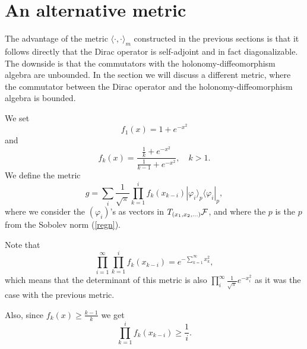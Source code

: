 \documentclass[letterpaper,12pt]{article}
\def\cf{{\cal F}}
\newcommand{\cF}{{\cal F}}
\begin{document}





















\section{An alternative metric}

The advantage of    the metric $\langle \cdot ,\cdot\rangle_m $  constructed in the previous sections  is that it follows directly that the Dirac operator is self-adjoint and in fact diagonalizable.  The downside is that the commutators with the holonomy-diffeomorphism algebra  are unbounded.  In the section we will discuss a different metric, where the commutator between the Dirac operator and the holonomy-diffeomorphism algebra is bounded. 

We set 
$$  f_1(x)=1+e^{-x^2}$$
and 
$$f_k (x)=\frac{\frac{1}{k}+e^{-x^2}}{\frac{1}{k-1}+e^{-x^2}} , \quad k>1 .$$
We define the metric
$$g=\sum_i  \frac{1}{\sqrt{\pi}}\prod_{k=1}^i f_k(x_{k-i}) |\varphi_i \rangle_p  \langle \varphi_i |_p ,$$
where we consider the $(\varphi_i)$'s as vectors in $T_{(x_1,x_2,\ldots )} \cF$, and where the $p$ is the $p$ from the Sobolev norm (\ref{regn}).

Note that 
$$ \prod_{i=1}^\infty  \prod_{k=1}^i f_k(x_{k-i}) =e^{-\sum_{k=1}^\infty x_k^2}, $$
which means that the determinant of this metric is also $\prod_i^\infty \frac{1}{\sqrt{\pi}}e^{-x_i^2}$ as it was the case with the previous metric.

Also, since $f_k (x)\geq \frac{k-1}{k} $ we get
 $$ \prod_{k=1}^i f_k(x_{k-i}) \geq \frac{1}{i} .$$
\end{document}
